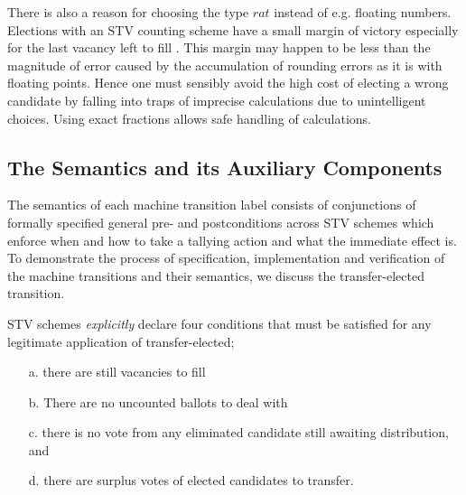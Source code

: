 \documentclass[10pt,conference]{IEEEtran}
\begin{document}
There is also a reason for choosing the type $rat$  
instead of e.g. floating numbers. Elections with an STV counting scheme have a small margin of victory especially for the last vacancy left to fill \cite{MBlo}. This margin may happen to be less than the magnitude of error caused by the accumulation of rounding errors as it is with floating points.  Hence one must sensibly avoid the high cost of electing a wrong candidate by falling into traps of imprecise calculations due to unintelligent choices. Using exact fractions allows safe handling of calculations. 
\subsection{The Semantics and its Auxiliary Components}
\label{sec:MachineSem}

The semantics of each machine transition label consists of conjunctions of formally specified general pre- and postconditions across STV schemes which enforce when and how to take a tallying action and what the immediate effect is. To demonstrate the process of specification, implementation and verification of the machine transitions and their semantics, we discuss the transfer-elected transition.


STV schemes \emph{explicitly} declare four conditions that must be satisfied  for any legitimate application of transfer-elected; 
\begin{itemize}
\item[a.] there are still vacancies to fill
\item[b.] There are no uncounted ballots to deal with
\item[c.] there is no vote from any eliminated candidate still awaiting distribution, and
\item[d.] there are surplus votes of elected candidates to  transfer.
\end{itemize}
\end{document}
